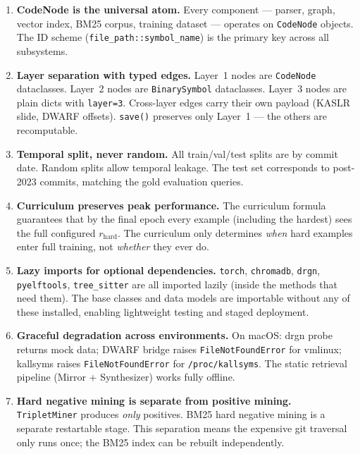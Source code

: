 \documentclass[11pt,a4paper]{article}
\newcommand{\coderef}[1]{\texttt{\small\color{layer2}#1}}
\begin{document}
\begin{enumerate}[leftmargin=2em, itemsep=4pt]

  \item \textbf{CodeNode is the universal atom.}
        Every component --- parser, graph, vector index, BM25 corpus, training
        dataset --- operates on \coderef{CodeNode} objects. The ID scheme
        (\texttt{file\_path::symbol\_name}) is the primary key across all
        subsystems.

  \item \textbf{Layer separation with typed edges.}
        Layer~1 nodes are \coderef{CodeNode} dataclasses.
        Layer~2 nodes are \coderef{BinarySymbol} dataclasses.
        Layer~3 nodes are plain dicts with \texttt{layer=3}.
        Cross-layer edges carry their own payload (KASLR slide, DWARF offsets).
        \texttt{save()} preserves only Layer~1 --- the others are recomputable.

  \item \textbf{Temporal split, never random.}
        All train/val/test splits are by commit date. Random splits allow
        temporal leakage. The test set corresponds to post-2023 commits,
        matching the gold evaluation queries.

  \item \textbf{Curriculum preserves peak performance.}
        The curriculum formula guarantees that by the final epoch every example
        (including the hardest) sees the full configured $r_{\text{hard}}$.
        The curriculum only determines \emph{when} hard examples enter full
        training, not \emph{whether} they ever do.

  \item \textbf{Lazy imports for optional dependencies.}
        \texttt{torch}, \texttt{chromadb}, \texttt{drgn}, \texttt{pyelftools},
        \texttt{tree\_sitter} are all imported lazily (inside the methods that
        need them). The base classes and data models are importable without any
        of these installed, enabling lightweight testing and staged deployment.

  \item \textbf{Graceful degradation across environments.}
        On macOS: drgn probe returns mock data; DWARF bridge raises
        \texttt{FileNotFoundError} for vmlinux; kallsyms raises
        \texttt{FileNotFoundError} for \texttt{/proc/kallsyms}. The static
        retrieval pipeline (Mirror + Synthesizer) works fully offline.

  \item \textbf{Hard negative mining is separate from positive mining.}
        \coderef{TripletMiner} produces \emph{only} positives. BM25 hard
        negative mining is a separate restartable stage. This separation means
        the expensive git traversal only runs once; the BM25 index can be
        rebuilt independently.

\end{enumerate}
\end{document}

